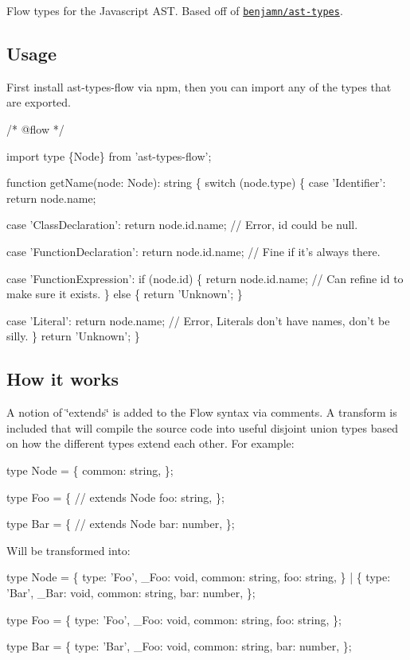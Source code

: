 Flow types for the Javascript A\+ST. Based off of \href{https://github.com/benjamn/ast-types}{\tt benjamn/ast-\/types}.

\subsection*{Usage}

First install {\ttfamily ast-\/types-\/flow} via npm, then you can import any of the types that are exported.


\begin{DoxyCode}
/* @flow */

import type \{Node\} from 'ast-types-flow';

function getName(node: Node): string \{
  switch (node.type) \{
    case 'Identifier':
      return node.name;

    case 'ClassDeclaration':
      return node.id.name; // Error, id could be null.

    case 'FunctionDeclaration':
      return node.id.name; // Fine if it's always there.

    case 'FunctionExpression':
      if (node.id) \{
        return node.id.name; // Can refine id to make sure it exists.
      \} else \{
        return 'Unknown';
      \}

    case 'Literal':
      return node.name; // Error, Literals don't have names, don't be silly.
  \}
  return 'Unknown';
\}
\end{DoxyCode}


\subsection*{How it works}

A notion of \char`\"{}extends\char`\"{} is added to the Flow syntax via comments. A transform is included that will compile the source code into useful disjoint union types based on how the different types extend each other. For example\+:


\begin{DoxyCode}
type Node = \{
  common: string,
\};

type Foo = \{
  // extends Node
  foo: string,
\};

type Bar = \{
  // extends Node
  bar: number,
\};
\end{DoxyCode}


Will be transformed into\+:


\begin{DoxyCode}
type Node = \{
  type: 'Foo',
  \_Foo: void,
  common: string,
  foo: string,
\} | \{
  type: 'Bar',
  \_Bar: void,
  common: string,
  bar: number,
\};

type Foo = \{
  type: 'Foo',
  \_Foo: void,
  common: string,
  foo: string,
\};

type Bar = \{
  type: 'Bar',
  \_Foo: void,
  common: string,
  bar: number,
\};
\end{DoxyCode}


